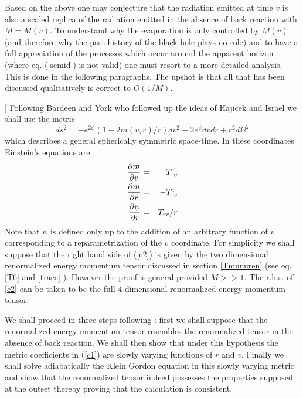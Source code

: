 \documentclass[12pt,oneside]{report}
\begin{document}
Based on the above one may conjecture that the radiation emitted at time $v$ is
also a scaled replica of the radiation emitted in the absence of back reaction
with $M=M(v)$. To understand why the evaporation is only controlled by $M(v)$
(and therefore why the past 
history of the black hole plays no role) and to have a full
appreciation of the processes which occur around the apparent horizon 
(where eq. (\ref{semid}) is not valid)
one must
resort to a more detailed analysis. This is done in the following paragraphs.
The upshot is that all that has been discussed qualitatively is correct to $O
(1/M)$. 
 

[ Following Bardeen\cite{Bard} and York\cite{York} who
followed up the ideas of 
Hajicek and Israel \cite{HI} we shall use the metric 
\begin{equation}
ds^2=-e^{2 \psi}(1-2m(v,r)/r)dv^2 + 2 e^\psi dvdr 
+r^2 d\Omega^2
\label{c1}
\end{equation}
which describes a general spherically symmetric space-time.
In these coordinates Einstein's
equations are
\begin{eqnarray}
{\partial m \over \partial v} &=&  T^r_{\
v}\nonumber\\
{\partial m \over \partial r} &=& - T^v_{\
v}\nonumber\\
{\partial \psi \over \partial r} &=& 
T_{rr} /r
\label{c2}
\end{eqnarray}
Note that $\psi$ is defined only up to the addition of an arbitrary
function of $v$ corresponding to a reparametrization of the $v$ coordinate.
For simplicity we shall suppose that the right hand side 
of (\ref{c2}) is given by the two dimensional
renormalized energy momentum tensor discussed in section \ref{Tmunuren} (see
eq. \ref{T6} and \ref{trace} ). However the proof is general provided $M>>1$. 
The r.h.s. of \ref{c2} can be taken to be the full 4 dimensional renormalized
energy momentum tensor.

We shall proceed in three steps following \cite{Massar2}: first we
shall suppose that the renormalized energy momentum tensor resembles the
renormalized tensor in the absence of back reaction. We shall then show
that under this hypothesis the metric coefficients in
(\ref{c1}) are slowly varying functions of $r$ and $v$. Finally we shall solve
adiabatically the Klein Gordon equation in this slowly varying metric and
show that the renormalized tensor indeed possesses the
properties supposed at the outset thereby proving that the calculation is
consistent.
\end{document}
